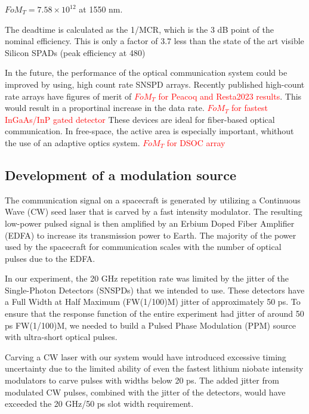 \documentclass{optica-article}
\begin{document}
\(FoM_T = 7.58 \times 10^{12}\) at 1550 nm.

The deadtime is calculated as the 1/MCR, which is the 3 dB point of the nominal efficiency. This is only a factor of 3.7 less than the state of the art visible Silicon SPADs (peak efficiency at 480\nm) \cite{Gramuglia2022}

In the future, the performance of the optical communication system could be improved by using, high count rate SNSPD arrays. Recently published high-count rate arrays have figures of merit of \textcolor{red}{\(FoM_T\) for Peacoq and Resta2023 results}. This would result in a proportinal increase in the data rate.
\textcolor{red}{\(FoM_T\) for fastest InGaAs/InP gated detector}
These devices are ideal for fiber-based optical communication. In free-space, the active area is especially important, whithout the use of an adaptive optics system.
\textcolor{red}{\(FoM_T\) for DSOC array}

\hypertarget{development-of-a-modulation-source}{%
\subsection{Development of a modulation source}\label{development-of-a-modulation-source}}

The communication signal on a spacecraft is generated by utilizing a Continuous Wave (CW) seed laser that is carved by a fast intensity modulator. The resulting low-power pulsed signal is then amplified by an Erbium Doped Fiber Amplifier (EDFA) to increase its transmission power to Earth. The majority of the power used by the spacecraft for communication scales with the number of optical pulses due to the EDFA.

In our experiment, the 20 GHz repetition rate was limited by the jitter of the Single-Photon Detectors (SNSPDs) that we intended to use. These detectors have a Full Width at Half Maximum (FW(1/100)M) jitter of approximately 50 ps. To ensure that the response function of the entire experiment had jitter of around 50 ps FW(1/100)M, we needed to build a Pulsed Phase Modulation (PPM) source with ultra-short optical pulses.

Carving a CW laser with our system would have introduced excessive timing uncertainty due to the limited ability of even the fastest lithium niobate intensity modulators to carve pulses with widths below 20 ps. The added jitter from modulated CW pulses, combined with the jitter of the detectors, would have exceeded the 20 GHz/50 ps slot width requirement.
\end{document}
